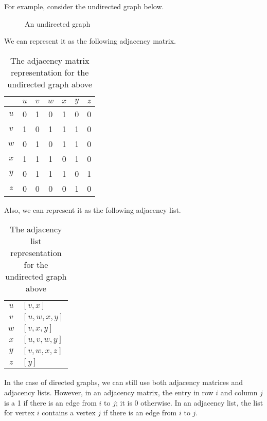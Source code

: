 \documentclass[a4paper, openany]{memoir}
\begin{document}
For example, consider the undirected graph below.
\begin{figure}[H]
    \centering
    \caption{An undirected graph}
\end{figure}
\noindent We can represent it as the following adjacency matrix.
\begin{table}[H]
    \centering
    \begin{tabular}{c|cccccc}
         & $u$ & $v$ & $w$ & $x$ & $y$ & $z$ \\
        \hline
        $u$ & 0 & 1 & 0 & 1 & 0 & 0 \\
        $v$ & 1 & 0 & 1 & 1 & 1 & 0 \\
        $w$ & 0 & 1 & 0 & 1 & 1 & 0 \\
        $x$ & 1 & 1 & 1 & 0 & 1 & 0 \\
        $y$ & 0 & 1 & 1 & 1 & 0 & 1 \\
        $z$ & 0 & 0 & 0 & 0 & 1 & 0
    \end{tabular}
    \caption{The adjacency matrix representation for the undirected graph above}
\end{table}
\noindent Also, we can represent it as the following adjacency list.
\begin{table}[H]
    \centering
    \begin{tabular}{c|l}
        $u$ & $[v, x]$ \\
        $v$ & $[u, w, x, y]$ \\
        $w$ & $[v, x, y]$ \\
        $x$ & $[u, v, w, y]$ \\
        $y$ & $[v, w, x, z]$ \\
        $z$ & $[y]$
    \end{tabular}
    \caption{The adjacency list representation for the undirected graph above}
\end{table}
In the case of directed graphs, we can still use both adjacency matrices and adjacency lists. However, in an adjacency matrix, the entry in row $i$ and column $j$ is a 1 if there is an edge from $i$ to $j$; it is 0 otherwise. In an adjacency list, the list for vertex $i$ contains a vertex $j$ if there is an edge from $i$ to $j$.
\end{document}
